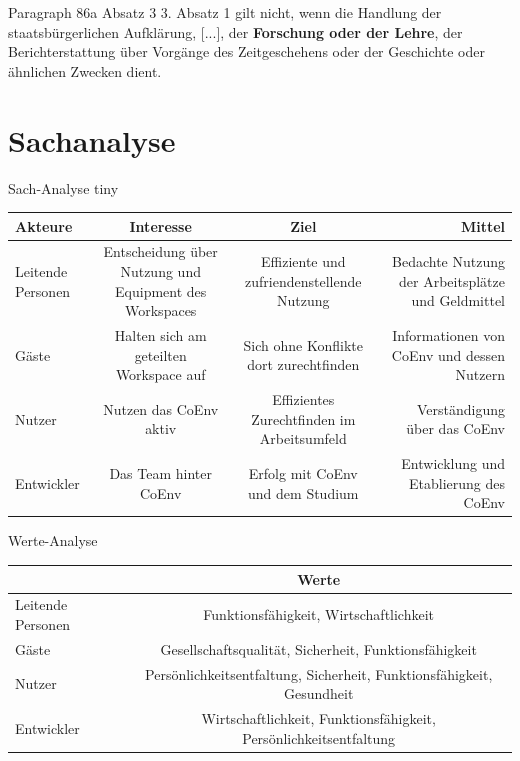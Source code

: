 \documentclass{cubeamer}
\begin{document}
\begin{frame}{Paragraph 86a Absatz 3}
    3. Absatz 1 gilt nicht, wenn die Handlung der staatsbürgerlichen Aufklärung, [...], der \textbf{Forschung oder der Lehre}, der Berichterstattung über Vorgänge des Zeitgeschehens oder der Geschichte oder ähnlichen Zwecken dient.
\end{frame}

\section{Sachanalyse}


\begin{frame}{Sach-Analyse}
    \hfuzz=500pt
    tiny{\begin{tabular}[h]{l|c|c|r}
        Akteure  & \textbf{Interesse} & \textbf{Ziel} & \textbf{Mittel} \\
        \hline
        Leitende Personen & Entscheidung über Nutzung und Equipment des Workspaces & Effiziente und zufriendenstellende Nutzung & Bedachte Nutzung der Arbeitsplätze und Geldmittel \\
        \hline
        Gäste & Halten sich am geteilten Workspace auf & Sich ohne Konflikte dort zurechtfinden & Informationen von CoEnv und dessen Nutzern \\
        \hline
        Nutzer & Nutzen das CoEnv aktiv & Effizientes Zurechtfinden im Arbeitsumfeld & Verständigung über das CoEnv \\ 
        \hline
        Entwickler & Das Team hinter CoEnv & Erfolg mit CoEnv und dem Studium & Entwicklung und Etablierung des CoEnv
    \end{tabular}}
\end{frame}

\begin{frame}{Werte-Analyse}
    \small{\begin{center}
        \begin{tabular}[h]{l|c}
              & \textbf{Werte} \\
            \hline
            Leitende Personen & Funktionsfähigkeit, Wirtschaftlichkeit \\
            \hline
            Gäste & Gesellschaftsqualität, Sicherheit, Funktionsfähigkeit \\
            \hline
            Nutzer & Persönlichkeitsentfaltung, Sicherheit, Funktionsfähigkeit, Gesundheit \\ 
            \hline
            Entwickler & Wirtschaftlichkeit, Funktionsfähigkeit, Persönlichkeitsentfaltung
        \end{tabular}
    \end{center}}
\end{frame}
\end{document}
